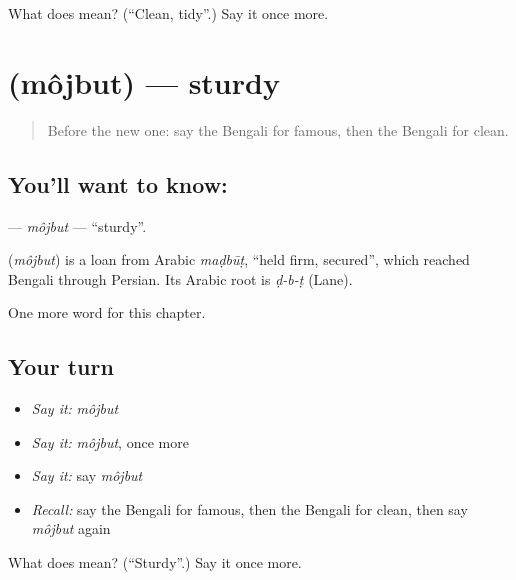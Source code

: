 \begin{tcolorbox}[breakable,colback=teal!4,colframe=teal!35!black,title={Before you move on}]
What does  mean? (\textquotedblleft{}Clean, tidy\textquotedblright{}.) Say it once more.
\end{tcolorbox}
\section[\texorpdfstring{\bn{মজবুত} (môjbut)}{মজবুত (môjbut)}]{ (môjbut) — sturdy}

\label{lesson:BN-C142-mojbut}



\begin{quote}
Before the new one: say the Bengali for famous, then the Bengali for clean.
\end{quote}

\subsection*{You'll want to know: }
\textbf{} — \emph{môjbut} — \textquotedblleft{}sturdy\textquotedblright{}.

\begin{cousinweb}
\textbf{} (\emph{môjbut}) is a loan from Arabic \emph{maḍbūṭ}, \textquotedblleft{}held firm, secured\textquotedblright{}, which reached Bengali through Persian. Its Arabic root is \emph{ḍ-b-ṭ} (Lane).
\end{cousinweb}

\begin{grammarlens}[title={What you've built}]
One more word for this chapter.
\end{grammarlens}

\subsection*{Your turn}
\begin{itemize}
\raggedright
  \item \emph{Say it:} \emph{môjbut}
  \item \emph{Say it:} \emph{môjbut}, once more
  \item \emph{Say it:} say \emph{môjbut}
  \item \emph{Recall:} say the Bengali for famous, then the Bengali for clean, then say \emph{môjbut} again
\end{itemize}

\begin{tcolorbox}[breakable,colback=teal!4,colframe=teal!35!black,title={Before you move on}]
What does  mean? (\textquotedblleft{}Sturdy\textquotedblright{}.) Say it once more.
\end{tcolorbox}
